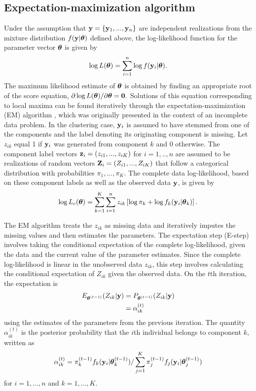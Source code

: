 \subsection{Expectation-maximization algorithm}\label{sec:em}
Under the assumption that $\mathbf y = \{\mathbf y_{1},...,\mathbf y_{n}\}$ are independent realizations from the mixture distribution $f(\mathbf y | \boldsymbol\theta)$ defined above, the log-likelihood function for the parameter vector $\boldsymbol \theta$ is given by
$$\log L(\boldsymbol\theta)=\sum^{n}_{i=1}\log f(\mathbf y_{i}|\boldsymbol \theta).$$
The maximum likelihood estimate of $\boldsymbol\theta$ is obtained by finding an appropriate root of the score equation, $\partial \log L(\boldsymbol\theta)/\partial \boldsymbol\theta=\mathbf 0.$ Solutions of this equation corresponding to local maxima can be found iteratively through the expectation-maximization (EM) algorithm \cite{dempster1977}, which was originally presented in the context of an incomplete data problem. In the clustering case, $\mathbf y_{i}$ is assumed to have stemmed from one of the components and the label denoting its originating component is missing. Let $z_{ik}$ equal 1 if $\mathbf y_{i}$ was generated from component $k$ and 0 otherwise. The component label vectors $\mathbf z_{i}=(z_{i1},...,z_{iK})$ for $i=1,..,n$ are assumed to be realizations of random vectors $\mathbf Z_{i}=(Z_{i1},...,Z_{iK})$ that follow a categorical distribution with probabilities $\pi_{1},...,\pi_{K}$. The complete data log-likelihood, based on these component labels as well as the observed data $\mathbf y$, is given by
$$\log L_{c}(\boldsymbol \theta) =  \sum^{K}_{k=1}\sum^{n}_{i=1}z_{ik}\left[\log \pi_{k}+\log f_{k}(\mathbf y_{i}|\boldsymbol\theta_k)\right].$$

The EM algorithm treats the $z_{ik}$ as missing data and iteratively imputes the missing values and then  estimates the parameters. The expectation step (E-step) involves taking the conditional expectation of the complete log-likelihood, given the data and the current value of the parameter estimates. Since the complete log-likelihood is linear in the unobserved data $z_{ik}$, this step involves calculating the conditional expectation of $Z_{ik}$ given the observed data. On the $t$th iteration, the expectation is
\begin{align*}
E_{\boldsymbol\theta^{(t-1)}}( Z_{ik}|\mathbf y) &= P_{\boldsymbol\theta^{(t-1)}}( Z_{ik}|\mathbf y)\\
&=\alpha_{ik}^{(t)}
\end{align*}
using the estimates of the parameters from the previous iteration. The quantity $\alpha_{ik}^{(t)}$ is the posterior probability that the $i$th individual belongs to component $k$, written as
$$\alpha_{ik}^{(t)}=\pi_{k}^{(t-1)}f_{k}(\mathbf y_{i}|\boldsymbol\theta^{(t-1)}_{k})/\sum_{j=1}^{K}\pi_{j}^{(t-1)}f_{j}(\mathbf y_{i}|\boldsymbol \theta_{j}^{(t-1)})$$
for $i=1,...,n$ and $k=1,...,K$.

